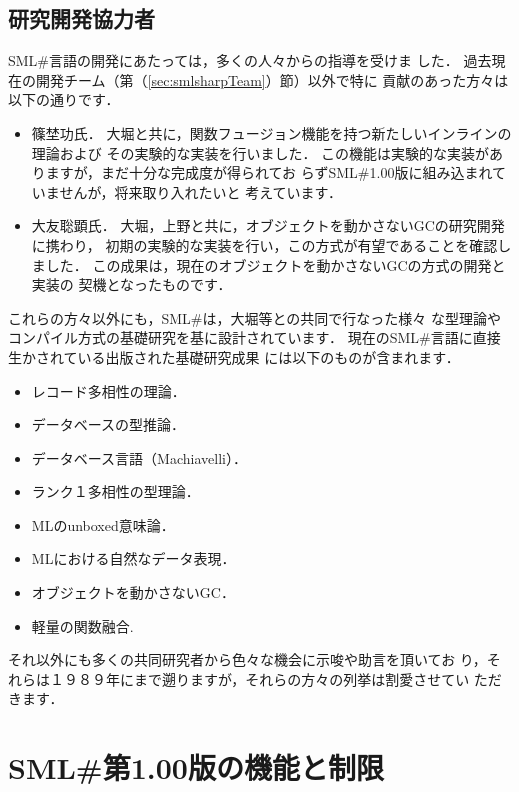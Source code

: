 \documentclass{jbook}
\newcommand{\smlsharp}{SML\#}
\newcommand{\version}{1.00}
\begin{document}
\subsection{研究開発協力者}
	\smlsharp{}言語の開発にあたっては，多くの人々からの指導を受けま
した．
	過去現在の開発チーム（第（\ref{sec:smlsharpTeam}）節）以外で特に
貢献のあった方々は以下の通りです．
\begin{itemize}
\item 篠埜功氏．
大堀と共に，関数フュージョン機能を持つ新たしいインラインの理論および
その実験的な実装を行いました．
	この機能は実験的な実装がありますが，まだ十分な完成度が得られてお
らず\smlsharp{}\version{}版に組み込まれていませんが，将来取り入れたいと
考えています．
\item 大友聡顕氏．
	大堀，上野と共に，オブジェクトを動かさないGCの研究開発に携わり，
初期の実験的な実装を行い，この方式が有望であることを確認しました．
	この成果は，現在のオブジェクトを動かさないGCの方式の開発と実装の
契機となったものです．
\end{itemize}
	これらの方々以外にも，\smlsharp{}は，大堀等との共同で行なった様々
な型理論やコンパイル方式の基礎研究を基に設計されています．
	現在の\smlsharp{}言語に直接生かされている出版された基礎研究成果
には以下のものが含まれます．
\begin{itemize}
\item レコード多相性の理論\cite{ohor92popl,ohor95toplas}．
\item データベースの型推論\cite{ohor88lfp}．
\item データベース言語（Machiavelli）\cite{ohor89sigmod,bune96tods}．
\item ランク１多相性の型理論\cite{ohor99icfp}．
\item MLのunboxed意味論\cite{ohor97unbox}．
\item MLにおける自然なデータ表現\cite{nguyen06ppdp}．
\item オブジェクトを動かさないGC\cite{ueno11icfp}．
\item 軽量の関数融合\cite{ohor07popl}.
\end{itemize}
	それ以外にも多くの共同研究者から色々な機会に示唆や助言を頂いてお
り，それらは１９８９年にまで遡りますが，それらの方々の列挙は割愛させてい
ただきます．


\section{\smlsharp{}第\version{}版の機能と制限}
\end{document}
